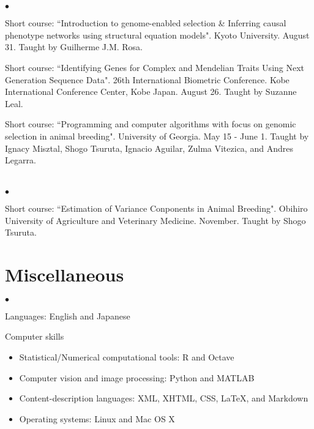 \documentclass[margin,line,10pt]{res}
\newenvironment{list2}{
  \begin{list}{$\bullet$}{%
      \setlength{\itemsep}{0in}
      \setlength{\parsep}{0in} \setlength{\parskip}{0in}
      \setlength{\topsep}{0in} \setlength{\partopsep}{0in} 
      \setlength{\leftmargin}{0.2in}}}{\end{list}}
\begin{document}
\begin{resume}
\section{}
\begin{list2}
\item Short course: ``Introduction to genome-enabled selection \& Inferring causal phenotype networks using structural equation models". 
Kyoto University. August 31. Taught by Guilherme J.M. Rosa. 

\vspace{0.5cm}

\item Short course: ``Identifying Genes for Complex and Mendelian Traits Using Next Generation Sequence Data". 26th International Biometric Conference. Kobe International Conference Center, Kobe Japan. August 26. Taught by Suzanne Leal.  

\vspace{0.5cm}

\item Short course: ``Programming and computer algorithms with focus on genomic selection in animal breeding".  University of Georgia. May 15 - June 1.  
Taught by Ignacy Misztal, Shogo Tsuruta, Ignacio Aguilar, Zulma Vitezica, and  Andres Legarra. 
\end{list2}  

\section{}
\begin{list2}
\item Short course: ``Estimation of Variance Conponents in Animal Breeding". Obihiro University of Agriculture and Veterinary Medicine. November. 
Taught by Shogo Tsuruta.  
\end{list2}  



\vspace{0.5cm}
\section{\sc Miscellaneous} 
\begin{list2}

\item Languages: English and Japanese
  \vspace{0.3cm}

\item Computer skills 
  \begin{itemize}
  \item Statistical/Numerical computational tools: R and Octave
  \item Computer vision and image processing: Python and MATLAB
  \item Content-description languages: XML, XHTML, CSS, \LaTeX, and Markdown
  \item Operating systems: Linux and Mac OS X
  \end{itemize}



\end{list2}
\end{resume}
\end{document}
